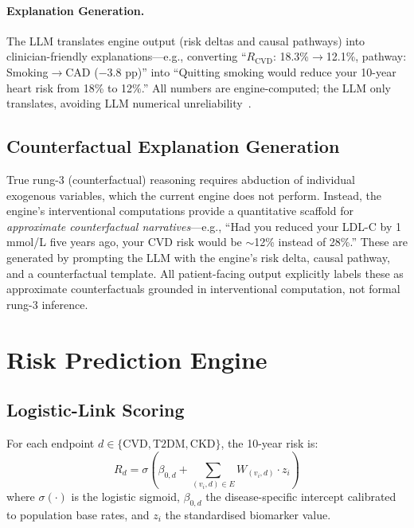 \documentclass[runningheads]{llncs}
\begin{document}
\paragraph{Explanation Generation.}
The LLM translates engine output (risk deltas and causal pathways)
into clinician-friendly explanations---e.g., converting
``$R_{\text{CVD}}$: 18.3\%$\to$12.1\%, pathway:
Smoking$\to$CAD ($-$3.8 pp)'' into ``Quitting smoking would reduce
your 10-year heart risk from 18\% to 12\%.''
All numbers are engine-computed; the LLM only translates,
avoiding LLM numerical unreliability~\cite{jin2023cladder}.

\subsection{Counterfactual Explanation Generation}\label{sec:counterfactual}

True rung-3 (counterfactual) reasoning requires abduction of
individual exogenous variables, which the current engine does not
perform.
Instead, the engine's interventional computations provide a
quantitative scaffold for \emph{approximate counterfactual
narratives}---e.g., ``Had you reduced your LDL-C by 1\,mmol/L
five years ago, your CVD risk would be ${\sim}$12\% instead of
28\%.''
These are generated by prompting the LLM with the engine's risk
delta, causal pathway, and a counterfactual template.
All patient-facing output explicitly labels these as approximate
counterfactuals grounded in interventional computation, not formal
rung-3 inference.

\section{Risk Prediction Engine}\label{sec:risk}

\subsection{Logistic-Link Scoring}\label{sec:logistic}

For each endpoint $d \in \{\text{CVD}, \text{T2DM}, \text{CKD}\}$,
the 10-year risk is:
\begin{equation}\label{eq:risk}
R_d = \sigma\!\left(\beta_{0,d} + \sum_{(v_i, d) \in E} W_{(v_i,d)} \cdot z_i\right)
\end{equation}
where $\sigma(\cdot)$ is the logistic sigmoid, $\beta_{0,d}$ the
disease-specific intercept calibrated to population base rates, and
$z_i$ the standardised biomarker value.
\end{document}
